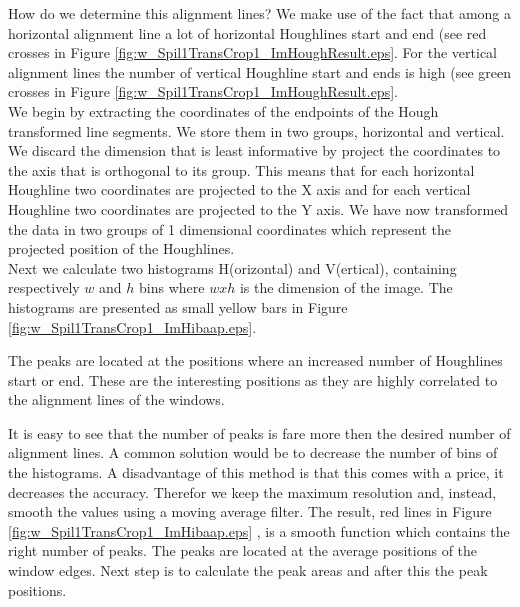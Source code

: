 How do we determine this alignment lines? We make use of the fact that among a
horizontal alignment line a lot of horizontal Houghlines start and end (see red
crosses in Figure \ref{fig:w_Spil1TransCrop1_ImHoughResult.eps}. For the vertical alignment lines
the number of vertical Houghline start and ends is high (see green crosses in
Figure \ref{fig:w_Spil1TransCrop1_ImHoughResult.eps}.\\

We begin by extracting the coordinates of the endpoints of the Hough transformed line
segments. We store them in two groups, horizontal and vertical.%
We discard the dimension that is least informative by project the coordinates to
the axis that is orthogonal to its group. 
This means that for each horizontal Houghline two coordinates are projected to the X
axis and for each vertical Houghline two coordinates are projected to the Y
axis. We have now transformed the data in two groups of 1 dimensional
coordinates which represent the projected position of the Houghlines.\\

Next we calculate two histograms H(orizontal) and V(ertical), containing respectively
$w$ and $h$ bins where $w x h$ is the dimension of the image.  The histograms
are presented as small yellow bars in Figure \ref{fig:w_Spil1TransCrop1_ImHibaap.eps}.

The peaks are located at the positions where an increased number of Houghlines
start or end.  These are the interesting positions as they are highly correlated
to the alignment lines of the windows. 

It is easy to see that the number of peaks is fare more then the desired number of alignment lines.
A common solution would be to decrease the number of bins of the histograms. A
disadvantage of this method is that this comes with a price, it decreases the accuracy. Therefor
we keep the maximum resolution and, instead, smooth the values using a moving average filter.
The result, red lines in Figure \ref{fig:w_Spil1TransCrop1_ImHibaap.eps}
, is a smooth function which contains the right number of peaks. The peaks
are located at the average positions of the window edges. Next step is to
calculate the peak areas and after this the peak positions. 

